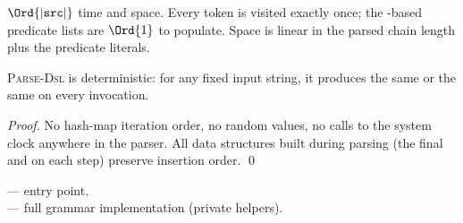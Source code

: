 \begin{complexity}
$\Ord{|\texttt{src}|}$ time and space. Every token is
visited exactly once; the -based predicate lists are
$\Ord{1}$ to populate. Space is linear in the parsed chain length
plus the predicate literals.
\end{complexity}

\begin{theorem}
\textsc{Parse-Dsl} is deterministic: for any fixed input string, it
produces the same  or the same  on
every invocation.
\end{theorem}

\begin{proof}
No hash-map iteration order, no random values, no calls to the
system clock anywhere in the parser. All data structures built
during parsing (the final  and
 on each step) preserve insertion order.
\qed
\end{proof}

\begin{inthecode}
 ---
 entry point.\\
 --- full grammar
implementation (private helpers).
\end{inthecode}

